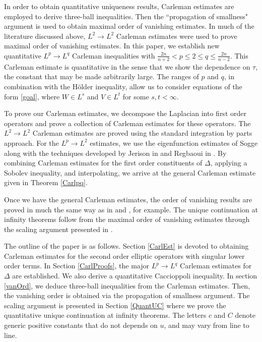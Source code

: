 \documentclass[11pt]{amsart}
\theoremstyle{plain}
\numberwithin{equation}{section}
\begin{document}
In order to obtain quantitative uniqueness results, Carleman estimates are employed to derive three-ball inequalities.
Then the ``propagation of smallness" argument is used to obtain maximal order of vanishing estimates.
In much of the literature discussed above, $L^2 \to L^2$ Carleman estimates were used to prove maximal order of vanishing estimates.
In this paper, we establish new quantitative $L^p \to L^q$ Carleman inequalities with $\frac{2n}{n+2}<p \leq 2 \le q \le \frac{2n}{n-2}$.
This Carleman estimate is quantitative in the sense that we show the dependence on $\tau$, the constant that may be made arbitrarily large.
The ranges of $p$ and $q$, in combination with the H\"older inequality, allow us to consider equations of the form \eqref{goal}, where $W  \in L^{s}$ and $V \in L^{t}$ for some $s, t < {\infty}$.

To prove our Carleman estimates, we decompose the Laplacian into first order operators and prove a collection of Carleman estimates for these operators.
The $L^2 \to L^2$ Carleman estimates are proved using the standard integration by parts approach.
For the $L^p \to L^2$ estimates, we use the eigenfunction estimates of Sogge \cite{Sog86} along with the techniques developed by Jerison in \cite{Jer86} and Regbaoui in \cite{Reg99}.
By combining Carleman estimates for the first order constituents of ${\Delta}$, applying a Sobolev inequality, and interpolating, we arrive at the general Carleman estimate given in Theorem \ref{Carlpq}.

Once we have the general Carleman estimates, the order of vanishing results are proved in much the same way as in \cite{BK05} and \cite{Ken07}, for example.
The unique continuation at infinity theorems follow from the maximal order of vanishing estimates through the scaling argument presented in \cite{BK05}.

The outline of the paper is as follows.
Section \ref{CarlEst} is devoted to obtaining Carleman estimates for the second order elliptic operators with singular lower order terms.
In Section \ref{CarlProofs}, the major $L^p\to L^q$ Carleman estimates for ${\Delta}$ are established.
We also derive a quantitative Caccioppoli inequality.
In section \ref{vanOrd}, we deduce three-ball inequalities from the Carleman estimates.
Then, the vanishing order is obtained via the propagation of smallness argument.
The scaling argument is presented in Section \ref{QuantUC} where we prove the quantitative unique continuation at infinity theorems.
The letters $c$ and $C$ denote generic positive constants that do not depends on $u$, and may vary from line to line.
\end{document}
